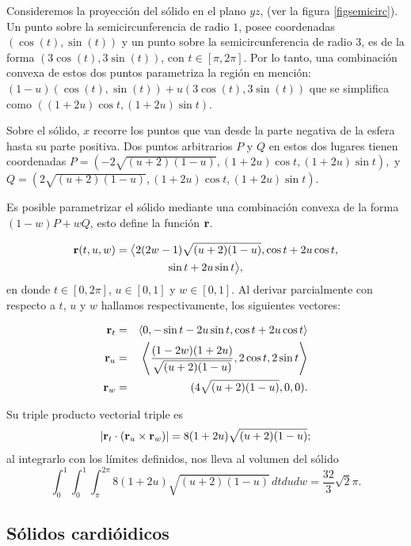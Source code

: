 Consideremos la proyección del sólido en el plano $yz$, (ver la figura \ref{figsemicirc}). Un punto sobre la semicircunferencia de radio $1$, posee coordenadas
$( \cos( t) ,\sin ( t) ) $ y un punto sobre la semicircunferencia de radio $3$, es de la forma
$( 3\cos ( t),3\sin ( t) ) $, con $t \in [ \pi ,2\pi ]$.
Por lo tanto, una combinación convexa de estos dos puntos parametriza la región en mención:
$( 1-u) ( \cos ( t) ,\sin ( t) )+u( 3\cos ( t) ,3\sin ( t) ) $
que se simplifica como $ ( ( 1+2u) \cos t,( 1+2u) \sin t) $.

Sobre el sólido, $x$ recorre los puntos que van desde la parte negativa de la esfera hasta su parte positiva. Dos puntos arbitrarios
$P$ y $Q$ en estos dos lugares tienen coordenadas
$P=(-2\sqrt{( u+2)( 1-u) },(1+2u)\cos t,(1+2u)\sin t), \,\, \text{y} $
$Q=(2\sqrt{( u+2) ( 1-u) },(1+2u)\cos t,(1+2u)\sin t)$.

Es posible parametrizar el sólido mediante una combinación convexa de la forma $(1-w)P+wQ$, esto define la función ${\bf r}$.
%

{\small
\begin{multline*}
{\bf r}(t,u,w) = \big \langle 2( 2w-1) \sqrt{( u+2)( 1-u) },\cos t+2u\cos t, \\ \sin t+2u\sin t \big \rangle,
\end{multline*}
}
en donde $t \in [0,2\pi]$, $u \in [0,1]$ y $w \in [0,1]$.
Al derivar parcialmente con respecto a $t$, $u$ y $w$ hallamos respectivamente, los siguientes vectores:
%

{\small
\begin{eqnarray*}
{\bf r}_{t} &=& \langle 0,-\sin t-2u\sin t,\cos t+2u\cos t\rangle \\
{\bf r}_{u} &=& \left \langle \frac{( 1-2w)( 1+2u)}{\sqrt{( u+2) ( 1-u) }},2\cos t,2\sin t\right \rangle \\
{\bf r}_{w} &=& ( 4\sqrt{( u+2) ( 1-u) },0,0).
\end{eqnarray*}
}
%

Su triple producto vectorial triple es
{\small
\[|{\bf r}_{t}\cdot({\bf r}_{u}\times{\bf r}_{w})|=8(1+2u)\sqrt{(u+2)(1-u)};\]
}
%
al integrarlo con los límites definidos, nos lleva al volumen del
sólido
%
{\small
\[\int_{0}^{1}\int_{0}^{1}\int_{\pi}^{2\pi}8(1+2u)\sqrt{(u+2)(1-u)}\,dtdudw=\frac{32}{3}\sqrt{2}\pi.\]
}

\subsection{Sólidos cardióidicos}  


